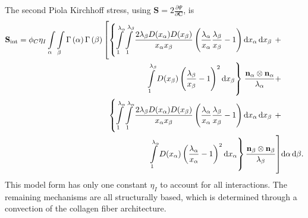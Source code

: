 The second Piola Kirchhoff stress, using $\mathbf{S}=2\frac{\partial\Psi}{\partial\mathbf{C}}$, is 
\begin{equation} \label{eq:interaction}
\begin{split}
\mathbf{S}_{\mathrm{int}} = \phi_C \eta_I \int\displaylimits_\alpha \int\displaylimits_\beta \Gamma \left(\alpha \right) \Gamma \left( \beta \right) 
\left[ \left\lbrace 
\int\displaylimits_1^{\lambda_\alpha} \int\displaylimits_1^{\lambda_\beta} 
\frac{2 \lambda_\beta D(x_\alpha) D(x_\beta)}{x_\alpha x_\beta} 
\left( \frac{\lambda_\alpha}{x_\alpha} \frac{\lambda_\beta}{x_\beta} - 1\right) \mathrm{d}x_\alpha \, \mathrm{d}x_\beta \right.\right. +&\\
\left. \left. \int\displaylimits_1^{\lambda_\beta} D(x_\beta) \left( \frac{\lambda_\beta}{x_\beta} -1  \right)^2 \mathrm{d}x_\beta \right\rbrace \right.  \frac{\mathbf{n}_\alpha \otimes \mathbf{n}_\alpha}{\lambda_\alpha} +& \\
\left. \left\lbrace
\int\displaylimits_1^{\lambda_\alpha} \int\displaylimits_1^{\lambda_\alpha} 
\frac{2 \lambda_\beta D(x_\alpha) D(x_\beta)}{x_\alpha x_\beta} 
\left( \frac{\lambda_\alpha}{x_\alpha} \frac{\lambda_\beta}{x_\beta} - 1\right) \mathrm{d}x_\alpha \, \mathrm{d}x_\beta 
\right. \right. +&\\
\left. \left. \int\displaylimits_1^{\lambda_\alpha} D(x_\alpha) \left( \frac{\lambda_\alpha}{x_\alpha} -1  \right)^2 \mathrm{d}x_\alpha \right\rbrace \frac{\mathbf{n}_\beta \otimes \mathbf{n}_\beta}{\lambda_\beta}  \right]& \mathrm{d}\alpha \, \mathrm{d}\beta.
\end{split}
\end{equation}
This model form has only one constant $\eta_I$ to account for all interactions. The remaining mechanisms are all structurally based, which is determined through a convection of the collagen fiber architecture. 
